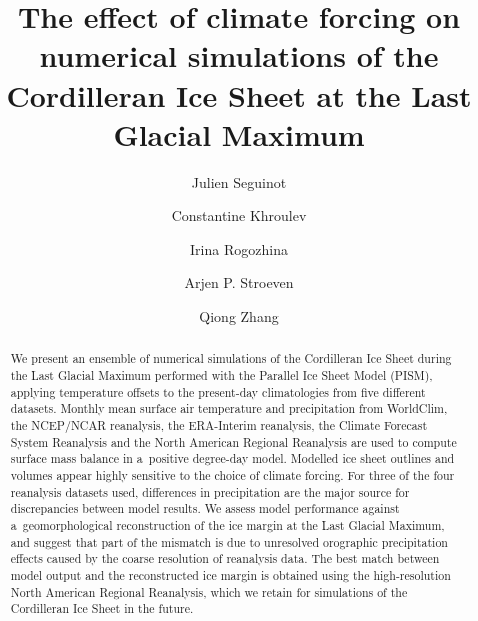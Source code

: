 \documentclass[tc, ms]{copernicus}
\begin{document}

\title{The effect of climate forcing on numerical simulations of the Cordilleran Ice Sheet at the Last Glacial Maximum}

\author[1]{Julien Seguinot}
\author[2]{Constantine Khroulev}
\author[3]{Irina Rogozhina}
\author[1]{Arjen P. Stroeven}
\author[1]{Qiong Zhang}


\received{}
\pubdiscuss{}
\revised{}
\accepted{}
\published{}

\maketitle

\begin{abstract}
We present an ensemble of numerical simulations of the Cordilleran Ice Sheet during the Last Glacial Maximum performed with the Parallel Ice Sheet Model (PISM), applying temperature offsets to the present-day climatologies from five different datasets. Monthly mean surface air temperature and precipitation from WorldClim, the NCEP/NCAR reanalysis, the ERA-Interim reanalysis, the Climate Forecast System Reanalysis and the North American Regional Reanalysis are used to compute surface mass balance in a~positive degree-day model. Modelled ice sheet outlines and volumes appear highly sensitive to the choice of climate forcing. For three of the four reanalysis datasets used, differences in precipitation are the major source for discrepancies between model results. We assess model performance against a~geomorphological reconstruction of the ice margin at the Last Glacial Maximum, and suggest that part of the mismatch is due to unresolved orographic precipitation effects caused by the coarse resolution of reanalysis data. The best match between model output and the reconstructed ice margin is obtained using the high-resolution North American Regional Reanalysis, which we retain for simulations of the Cordilleran Ice Sheet in the future.
\end{abstract}
\end{document}

